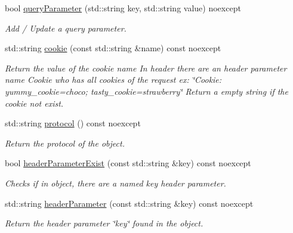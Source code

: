 \begin{DoxyCompactItemize}
bool \hyperlink{classHttpRequest_a09bf36e9a2c76927ee45e6c5c699c461}{query\+Parameter} (std\+::string key, std\+::string value) noexcept
\begin{DoxyCompactList}\small\item\em Add / Update a query parameter. \end{DoxyCompactList}\item 
\mbox{\label{classHttpRequest_abc502aa6bf23ed6cdecfa25f36dc3eb9}} 
std\+::string \hyperlink{classHttpRequest_abc502aa6bf23ed6cdecfa25f36dc3eb9}{cookie} (const std\+::string \&name) const noexcept
\begin{DoxyCompactList}\small\item\em Return the value of the cookie \textquotesingle{}name\textquotesingle{} In header there are an header parameter name \textquotesingle{}Cookie\textquotesingle{} who has all cookies of the request ex\+: \char`\"{}\+Cookie\+: yummy\+\_\+cookie=choco; tasty\+\_\+cookie=strawberry\char`\"{} Return a empty string if the cookie not exist. \end{DoxyCompactList}\item 
\mbox{\label{classHttpRequest_afa7c70d447bee6e233488d66e9cc1c21}} 
std\+::string \hyperlink{classHttpRequest_afa7c70d447bee6e233488d66e9cc1c21}{protocol} () const noexcept
\begin{DoxyCompactList}\small\item\em Return the protocol of the object. \end{DoxyCompactList}\item 
bool \hyperlink{classHttpRequest_a74ea75d8685647989346bd5d1d25702a}{header\+Parameter\+Exist} (const std\+::string \&key) const noexcept
\begin{DoxyCompactList}\small\item\em Checks if in object, there are a named \textquotesingle{}key\textquotesingle{} header parameter. \end{DoxyCompactList}\item 
std\+::string \hyperlink{classHttpRequest_a96f232879fff933182a3ed5c80229df6}{header\+Parameter} (const std\+::string \&key) const noexcept
\begin{DoxyCompactList}\small\item\em Return the header parameter \char`\"{}key\char`\"{} found in the object. \end{DoxyCompactList}\item 

\end{DoxyCompactItemize}

